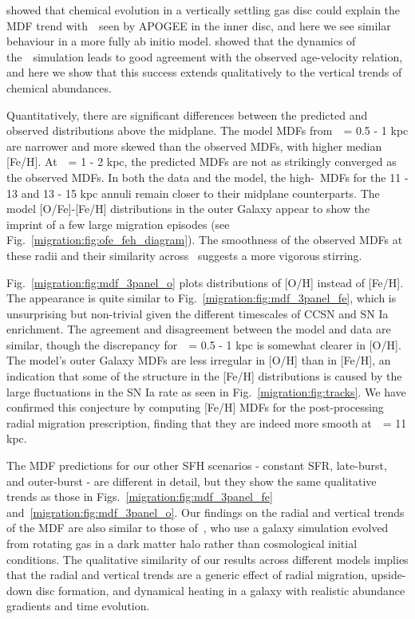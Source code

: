 \citet{Freudenburg2017} showed that chemical evolution in a vertically settling 
gas disc could explain the MDF trend with~\absz~seen by APOGEE in the inner 
disc, and here we see similar behaviour in a more fully ab initio model. 
\citet{Bird2021} showed that the dynamics of the~\hsim~simulation leads to good 
agreement with the observed age-velocity relation, and here we show that 
this success extends qualitatively to the vertical trends of chemical 
abundances. 
\par 
Quantitatively, there are significant differences between the predicted and 
observed distributions above the midplane. 
The model MDFs from~\absz~= 0.5 - 1 kpc are narrower and more skewed than the 
observed MDFs, with higher median [Fe/H]. 
At~\absz~= 1 - 2 kpc, the predicted MDFs are not as strikingly converged as the 
observed MDFs. 
In both the data and the model, the high-\absz~MDFs for the 11 - 13 and 13 - 15 
kpc annuli remain closer to their midplane counterparts. 
The model [O/Fe]-[Fe/H] distributions in the outer Galaxy appear to show the 
imprint of a few large migration episodes (see Fig.~\ref{migration:fig:ofe_feh_diagram}). 
The smoothness of the observed MDFs at these radii and their similarity across 
\absz~suggests a more vigorous stirring. 
\par 
Fig.~\ref{migration:fig:mdf_3panel_o} plots distributions of [O/H] instead of [Fe/H]. 
The appearance is quite similar to Fig.~\ref{migration:fig:mdf_3panel_fe}, which is 
unsurprising but non-trivial given the different timescales of CCSN and SN Ia 
enrichment. 
The agreement and disagreement between the model and data are similar, though 
the discrepancy for~\absz~= 0.5 - 1 kpc is somewhat clearer in [O/H]. 
The model's outer Galaxy MDFs are less irregular in [O/H] than in [Fe/H], an 
indication that some of the structure in the [Fe/H] distributions is caused by 
the large fluctuations in the SN Ia rate as seen in Fig.~\ref{migration:fig:tracks}. 
We have confirmed this conjecture by computing [Fe/H] MDFs for the 
post-processing radial migration prescription, finding that they are indeed 
more smooth at~\rgal~= 11 kpc. 
\par 
The MDF predictions for our other SFH scenarios - constant SFR, late-burst, and 
outer-burst - are different in detail, but they show the same qualitative 
trends as those in Figs.~\ref{migration:fig:mdf_3panel_fe} and~\ref{migration:fig:mdf_3panel_o}. 
Our findings on the radial and vertical trends of the MDF are also similar 
to those of~\citet{Loebman2016}, who use a galaxy simulation evolved from 
rotating gas in a dark matter halo rather than cosmological initial conditions. 
The qualitative similarity of our results across different models implies that 
the radial and vertical trends are a generic effect of radial migration, 
upside-down disc formation, and dynamical heating in a galaxy with realistic 
abundance gradients and time evolution. 


